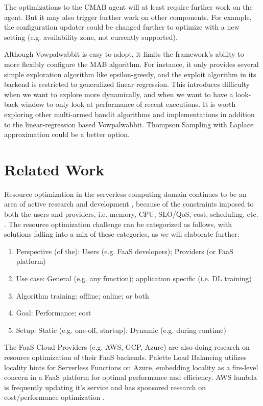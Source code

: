 \documentclass[conference]{IEEEtran}
\begin{document}
The optimizations to the CMAB agent will at least require further work on the agent. But it may also trigger further work on other components. For example, the configuration updater could be changed further to optimize with a new setting (e.g. availability zone, not currently supported).

Although Vowpalwabbit is easy to adopt, it limits the framework's ability to more flexibly configure the MAB algorithm. For instance, it only provides several simple exploration algorithm like epsilon-greedy, and the exploit algorithm in its backend is restricted to generalized linear regression. This introduces difficulty when we want to explore more dynamically, and when we want to have a look-back window to only look at performance of recent executions. It is worth exploring other multi-armed bandit algorithms and implementations in addition to the linear-regression based Vowpalwabbit. Thompson Sampling with Laplace approximation could be a better option.

\section{Related Work}

Resource optimization in the serverless computing domain continues to be an area of active research and development \cite{10.1145/3587249, 10.1145/3406011, 9756233}, because of the constraints imposed to both the users and providers, i.e. memory, CPU, SLO/QoS, cost, scheduling, etc. \cite{10181224, 10.1145/3542929.3563469, 9860980, 9460548, 10.1145/3429880.3430099}. The resource optimization challenge can be categorized as follows, with solutions falling into a mix of these categories, as we will elaborate further:

\begin{enumerate}
    \item Perspective (of the): Users (e.g. FaaS developers); Providers (or FaaS platform)
    \item Use case: General (e.g. any function); application specific (i.e. DL training)
    \item Algorithm training: offline; online; or both
    \item Goal: Performance; cost
    \item Setup: Static (e.g. one-off, startup); Dynamic (e.g. during runtime)
\end{enumerate}

The FaaS Cloud Providers (e.g. AWS, GCP, Azure) are also doing research on resource optimization of their FaaS backends. Palette Load Balancing \cite{10.1145/3552326.3567496} utilizes locality hints for Serverless Functions on Azure, embedding locality as a firs-level concern in a FaaS platform for optimal performance and efficiency. AWS lambda is frequently updating it's service \cite{aws_new} and has sponsored research on cost/performance optimization \cite{aws_operating_lambda_performance_optimization}.
\end{document}
